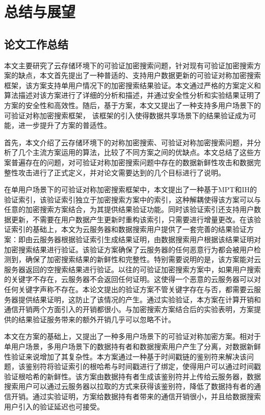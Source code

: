 \chapter{总结与展望}
\label{cha:conclusion}
\section{论文工作总结}
本文主要研究了云存储环境下的可验证加密搜索问题，针对现有可验证加密搜索方案的缺点，本文首先提出了一种普适的、支持用户数据更新的可验证对称加密搜索框架\single，该方案支持单用户情况下的加密搜索结果验证。本文通过严格的方案定义和算法描述对该方案进行了详细的分析和描述，并通过安全性分析和实验结果证明了\single 方案的安全性和高效性。随后，基于\single 方案，本文又提出了一种支持多用户场景下的可验证对称加密搜索框架\multi ， 该框架的引入使得数据共享场景下的结果验证成为可能，进一步提升了方案的普适性。

首先，本文介绍了云存储环境下的对称加密搜索、可验证对称加密搜索问题，并分析了几个主流方案运用的算法，比较了不同方案之间的优缺点。本文总结了这些方案普遍存在的问题，对可验证对称加密搜索问题中存在的数据新鲜性攻击和数据完整性攻击进行了正式定义，并对论文需要达到的几个目标进行了说明。

在单用户场景下的可验证对称加密搜索框架\single 中，本文提出了一种基于MPT和IH的验证索引，该验证索引独立于加密搜索方案中的索引，这种解耦使得该方案可以与任意的加密搜索方案结合，为其提供结果验证功能。同时该验证索引还支持用户数据更新，不需要在用户数据产生更新时重构该索引，只需要进行增量更改。在该验证索引的基础上，本文为云服务器和数据搜索用户提供了一套完善的结果验证方案：即由云服务器根据验证索引生成结果证明，由数据搜索用户根据该结果证明对加密搜索结果进行验证。该验证方案确保了云服务器的任何恶意行为都会被用户检测到，确保了加密搜索结果的新鲜性和完整性。特别需要说明的是，该方案能对云服务器返回的空搜索结果进行验证。以往的可验证加密搜索方案中，如果用户搜索的关键字不存在，云服务器不会返回任何证明。这使得一个恶意的云服务器可以对任何关键字声称不存在。本论文提出的验证方案不管关键字存在与否，都需要云服务器提供结果证明，这防止了该情况的产生。通过实验验证，本方案在计算开销和通信开销两个方面引入的开销都很小。与加密搜索方案结合后的实验表明，\single 方案提供的结果验证服务带来的额外开销几乎可以忽略不计。

本文在\single 方案的基础上，又提出了一种多用户场景下的可验证对称加密方案\multi 。相对于单用户场景，多用户场景下的数据持有者和数据搜索用户产生了分离，对数据新鲜性验证来说增加了其复杂性。本方案通过一种基于时间戳链的鉴别符来解决该问题，该鉴别符将验证索引的根哈希与时间戳进行了绑定，使得用户可以通过时间戳验证根哈希的新鲜性。该方案由数据持有者生成该鉴别符并上传给云服务器，数据搜索用户可以通过云服务器以拉取的方式来获得该鉴别符，降低了数据持有者的通信开销。通过实验证明，\multi 方案给数据持有者带来的通信开销很小，并且给数据搜索用户引入的验证延迟也可接受。

